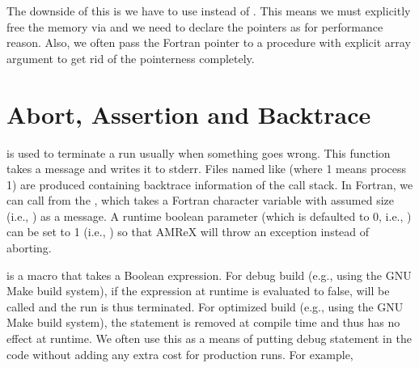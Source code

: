 \documentclass[letterpaper,10pt,english]{sphinxmanual}
\begin{document}
\sphinxAtStartPar
The downside of this is we have to use  instead of
. This means we must explicitly free the memory via
 and we need to declare the pointers as
 for performance reason.  Also, we often
pass the Fortran pointer to a procedure with explicit array argument
to get rid of the pointerness completely.


\section{Abort, Assertion and Backtrace}
\label{\detokenize{Basics:abort-assertion-and-backtrace}}
\sphinxAtStartPar
{} is used to terminate a run usually
when something goes wrong. This function takes a message and writes it to
stderr. Files named like  (where 1 means process 1)
are produced containing backtrace information of the call stack. In Fortran, we
can call  from the , which
takes a Fortran character variable with assumed size (i.e., )
as a message.  A  runtime boolean parameter
 (which is defaulted to 0, i.e., )
can be set to 1 (i.e., ) so that AMReX will throw an
exception instead of aborting.

\sphinxAtStartPar
{} is a macro that takes a Boolean expression. For debug build
(e.g.,  using the GNU Make build system), if the expression at
runtime is evaluated to false,  will be called and the run
is thus terminated. For optimized build (e.g.,  using the GNU
Make build system), the  statement is removed at compile
time and thus has no effect at runtime. We often use this as a means of putting
debug statement in the code without adding any extra cost for production runs.
For example,
\end{document}
